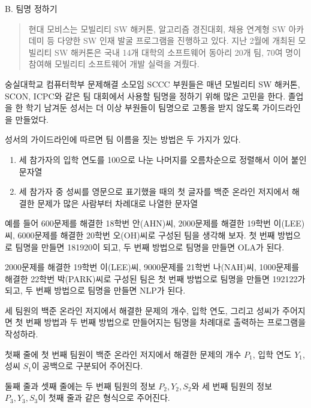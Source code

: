 \def\probtitle{팀명 정하기}
\def\probno{B}

\begin{problem}{\probno{}. \probtitle{}}

\begin{quote}
    현대 모비스는 모빌리티 SW 해커톤, 알고리즘 경진대회, 채용 연계형 SW 아카데미 등 다양한 SW 인재 발굴 프로그램을 진행하고 있다. 지난 2월에 개최된 모빌리티 SW 해커톤은 국내 14개 대학의 소프트웨어 동아리 20개 팀, 70여 명이 참여해 모빌리티 소프트웨어 개발 실력을 겨뤘다.
\end{quote}

숭실대학교 컴퓨터학부 문제해결 소모임 SCCC 부원들은 매년 모빌리티 SW 해커톤, SCON, ICPC와 같은 팀 대회에서 사용할 팀명을 정하기 위해 많은 고민을 한다. 졸업을 한 학기 남겨둔 성서는 더 이상 부원들이 팀명으로 고통을 받지 않도록 가이드라인을 만들었다.

성서의 가이드라인에 따르면 팀 이름을 짓는 방법은 두 가지가 있다.

\begin{enumerate}[noitemsep]
    \item 세 참가자의 입학 연도를 100으로 나눈 나머지를 오름차순으로 정렬해서 이어 붙인 문자열
    \item 세 참가자 중 성씨를 영문으로 표기했을 때의 첫 글자를 백준 온라인 저지에서 해결한 문제가 많은 사람부터 차례대로 나열한 문자열
\end{enumerate}

예를 들어 600문제를 해결한 18학번 안(AHN)씨, 2000문제를 해결한 19학번 이(LEE)씨, 6000문제를 해결한 20학번 오(OH)씨로 구성된 팀을 생각해 보자. 첫 번째 방법으로 팀명을 만들면 181920이 되고, 두 번째 방법으로 팀명을 만들면 OLA가 된다.

2000문제를 해결한 19학번 이(LEE)씨, 9000문제를 21학번 나(NAH)씨, 1000문제를 해결한 22학번 박(PARK)씨로 구성된 팀은 첫 번째 방법으로 팀명을 만들면 192122가 되고, 두 번째 방법으로 팀명을 만들면 NLP가 된다.

세 팀원의 백준 온라인 저지에서 해결한 문제의 개수, 입학 연도, 그리고 성씨가 주어지면 첫 번째 방법과 두 번째 방법으로 만들어지는 팀명을 차례대로 출력하는 프로그램을 작성하라.

\InputFile

첫째 줄에 첫 번째 팀원이 백준 온라인 저지에서 해결한 문제의 개수 $P_1$, 입학 연도 $Y_1$, 성씨 $S_1$이 공백으로 구분되어 주어진다.

둘째 줄과 셋째 줄에는 두 번째 팀원의 정보 $P_2, Y_2, S_2$와 세 번째 팀원의 정보 $P_3, Y_3, S_3$이 첫째 줄과 같은 형식으로 주어진다.


\end{problem}
